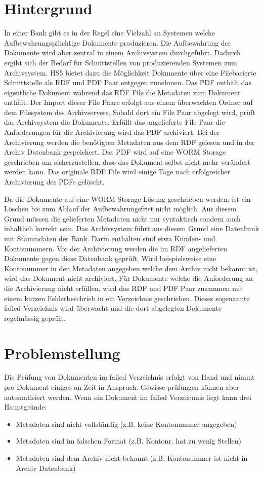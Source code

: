 \documentclass[a4paper,oneside, 12pt]{report}
\begin{document}
\section{Hintergrund}
In einer Bank gibt es in der Regel eine Vielzahl an Systemen welche Aufbewahrungspflichtige Dokumente produzieren. Die Aufbewahrung der Dokumente wird aber zentral in einem Archivsystem durchgeführt. Dadurch ergibt sich der Bedarf für Schnittstellen von produzierenden Systemen zum Archivsystem. \ac{HS5} bietet dazu die Möglichkeit Dokumente über eine Filebasierte Schnittstelle als \ac{RDF} und PDF Paar entgegen zunehmen. Das PDF enthält das eigentliche Dokument während das \ac{RDF} File die Metadaten zum Dokument enthält. Der Import dieser File Paare erfolgt aus einem überwachten Ordner auf dem Filesystem des Archivservers. Sobald dort ein File Paar abgelegt wird, prüft das Archivsystem die Dokumente. Erfüllt das angelieferte File Paar die Anforderungen für die Archivierung wird das PDF archiviert. Bei der Archivierung werden die benötigten Metadaten aus dem \ac{RDF} gelesen und in der Archiv Datenbank gespeichert. Das PDF wird auf eine \ac{WORM} Storage geschrieben um sicherzustellen, dass das Dokument selbst nicht mehr verändert werden kann. Das originale \ac{RDF} File wird einige Tage nach erfolgreicher Archivierung des PDFs gelöscht.

Da die Dokumente auf eine \ac{WORM} Storage Lösung geschrieben werden, ist ein Löschen bis zum Ablauf der Aufbewahrungsfrist nicht möglich. Aus diesem Grund müssen die gelieferten Metadaten nicht nur syntaktisch sondern auch inhaltlich korrekt sein. Das Archivsystem führt aus diesem Grund eine Datenbank mit Stammdaten der Bank. Darin enthalten sind etwa Kunden- und Kontonummern. Vor der Archivierung werden die im \ac{RDF} angelieferten Dokumente gegen diese Datenbank geprüft. Wird beispielsweise eine Kontonummer in den Metadaten angegeben welche dem Archiv nicht bekannt ist, wird das Dokument nicht archiviert. Für Dokumente welche die Anforderung an die Archivierung nicht erfüllen, wird das RDF und PDF Paar zusammen mit einem kurzen Fehlerbeschrieb in ein Verzeichnis geschrieben. Dieses sogenannte failed Verzeichnis wird überwacht und die dort abgelegten Dokumente regelmässig geprüft.

\section{Problemstellung}
Die Prüfung von Dokumenten im failed Verzeichnis erfolgt von Hand und nimmt pro Dokument einiges an Zeit in Anspruch. Gewisse prüfungen können aber automatisiert werden. Wenn ein Dokument im failed Verzeicunis liegt kann drei Hauptgründe:
\begin{itemize}\itemsep=0.5pt
  \item Metadaten sind nicht vollständig  (z.B. keine Kontonummer angegeben)
  \item Metadaten sind im falschen Format (z.B. Kontonr. hat zu wenig Stellen)
  \item Metadaten sind dem Archiv nicht bekannt (z.B. Kontonummer ist nicht in Archiv Datenbank)
\end{itemize}
\end{document}
